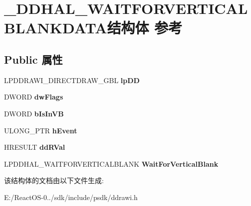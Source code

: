 \hypertarget{struct___d_d_h_a_l___w_a_i_t_f_o_r_v_e_r_t_i_c_a_l_b_l_a_n_k_d_a_t_a}{}\section{\+\_\+\+D\+D\+H\+A\+L\+\_\+\+W\+A\+I\+T\+F\+O\+R\+V\+E\+R\+T\+I\+C\+A\+L\+B\+L\+A\+N\+K\+D\+A\+T\+A结构体 参考}
\label{struct___d_d_h_a_l___w_a_i_t_f_o_r_v_e_r_t_i_c_a_l_b_l_a_n_k_d_a_t_a}
\subsection*{Public 属性}
\begin{DoxyCompactItemize}
\item 
\mbox{\label{struct___d_d_h_a_l___w_a_i_t_f_o_r_v_e_r_t_i_c_a_l_b_l_a_n_k_d_a_t_a_a5c159ece4163101877200fe75cd9f70a}} 
L\+P\+D\+D\+R\+A\+W\+I\+\_\+\+D\+I\+R\+E\+C\+T\+D\+R\+A\+W\+\_\+\+G\+BL {\bfseries lp\+DD}
\item 
\mbox{\label{struct___d_d_h_a_l___w_a_i_t_f_o_r_v_e_r_t_i_c_a_l_b_l_a_n_k_d_a_t_a_ae2174368ae1bd595cd0e204a2bc702f1}} 
D\+W\+O\+RD {\bfseries dw\+Flags}
\item 
\mbox{\label{struct___d_d_h_a_l___w_a_i_t_f_o_r_v_e_r_t_i_c_a_l_b_l_a_n_k_d_a_t_a_a9cbfa41efc6ed363f7f550150d013221}} 
D\+W\+O\+RD {\bfseries b\+Is\+In\+VB}
\item 
\mbox{\label{struct___d_d_h_a_l___w_a_i_t_f_o_r_v_e_r_t_i_c_a_l_b_l_a_n_k_d_a_t_a_a06786229808679555776b623f2e53491}} 
U\+L\+O\+N\+G\+\_\+\+P\+TR {\bfseries h\+Event}
\item 
\mbox{\label{struct___d_d_h_a_l___w_a_i_t_f_o_r_v_e_r_t_i_c_a_l_b_l_a_n_k_d_a_t_a_a13e8856f8954ad27ecbdf17f971ecaee}} 
H\+R\+E\+S\+U\+LT {\bfseries dd\+R\+Val}
\item 
\mbox{\label{struct___d_d_h_a_l___w_a_i_t_f_o_r_v_e_r_t_i_c_a_l_b_l_a_n_k_d_a_t_a_a361e00c57d48a18eb2c9cde5fab5bc59}} 
L\+P\+D\+D\+H\+A\+L\+\_\+\+W\+A\+I\+T\+F\+O\+R\+V\+E\+R\+T\+I\+C\+A\+L\+B\+L\+A\+NK {\bfseries Wait\+For\+Vertical\+Blank}
\end{DoxyCompactItemize}


该结构体的文档由以下文件生成\+:\begin{DoxyCompactItemize}
\item 
E\+:/\+React\+O\+S-\/0../sdk/include/psdk/ddrawi.\+h\end{DoxyCompactItemize}
